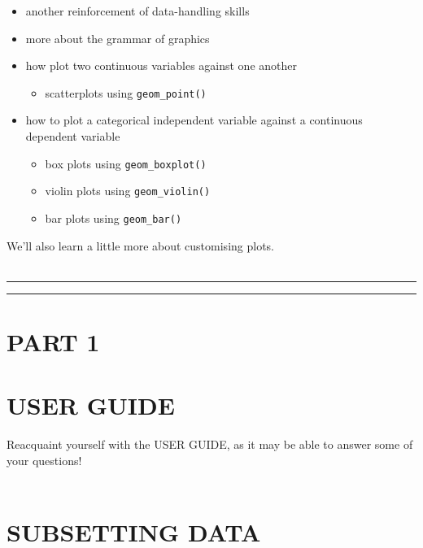 \documentclass[
]{book}
\providecommand{\tightlist}{%
  \setlength{\itemsep}{0pt}\setlength{\parskip}{0pt}}
\begin{document}
\begin{itemize}
\tightlist
\item
  another reinforcement of data-handling skills
\item
  more about the grammar of graphics
\item
  how plot two continuous variables against one another

  \begin{itemize}
  \tightlist
  \item
    scatterplots using \texttt{geom\_point()}
  \end{itemize}
\item
  how to plot a categorical independent variable against a continuous dependent variable

  \begin{itemize}
  \tightlist
  \item
    box plots using \texttt{geom\_boxplot()}
  \item
    violin plots using \texttt{geom\_violin()}
  \item
    bar plots using \texttt{geom\_bar()}
  \end{itemize}
\end{itemize}

We'll also learn a little more about customising plots.\\
~\\

\begin{center}\rule{0.5\linewidth}{\linethickness}\end{center}

\begin{center}\rule{0.5\linewidth}{\linethickness}\end{center}

\hypertarget{part-1}{%
\section{PART 1}\label{part-1}}

\hypertarget{user-guide}{%
\section{USER GUIDE}\label{user-guide}}

Reacquaint yourself with the USER GUIDE, as it may be able to answer some of
your questions!\\
~\\

\hypertarget{subsetting-data}{%
\section{SUBSETTING DATA}\label{subsetting-data}}
\end{document}

